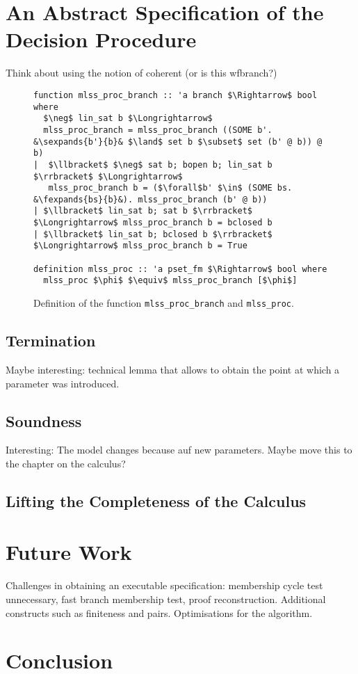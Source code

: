 \documentclass[sigplan,10pt,anonymous,review]{acmart}
\newcommand{\lefttrianglebar}{\mathrel{\tikz[baseline]{\draw (1ex, 0.75ex) -- (0, 1.25ex) -- (0, 0.25ex) -- cycle; \draw (0, 0.75ex) -- (1ex, 0.75ex);}}}
\newcommand{\lefttriangle}{\mathrel{\tikz[baseline]{\draw (1ex, 0.75ex) -- (0, 1.25ex) -- (0, 0.25ex) -- cycle;}}}
\newcommand{\sexpands}[2]{#1 $\lefttriangle$ #2}
\newcommand{\fexpands}[2]{#1 $\lefttrianglebar$ #2}
\begin{document}
\section{An Abstract Specification of the Decision Procedure}
Think about using the notion of coherent (or is this wfbranch?)
\begin{figure*}
  \centering
\begin{lstlisting}
function mlss_proc_branch :: 'a branch $\Rightarrow$ bool where
  $\neg$ lin_sat b $\Longrightarrow$
  mlss_proc_branch = mlss_proc_branch ((SOME b'. &\sexpands{b'}{b}& $\land$ set b $\subset$ set (b' @ b)) @ b)
|  $\llbracket$ $\neg$ sat b; bopen b; lin_sat b $\rrbracket$ $\Longrightarrow$
   mlss_proc_branch b = ($\forall$b' $\in$ (SOME bs. &\fexpands{bs}{b}&). mlss_proc_branch (b' @ b))
| $\llbracket$ lin_sat b; sat b $\rrbracket$ $\Longrightarrow$ mlss_proc_branch b = bclosed b
| $\llbracket$ lin_sat b; bclosed b $\rrbracket$ $\Longrightarrow$ mlss_proc_branch b = True

definition mlss_proc :: 'a pset_fm $\Rightarrow$ bool where
  mlss_proc $\phi$ $\equiv$ mlss_proc_branch [$\phi$]
\end{lstlisting}
\caption{Definition of the function \lstinline|mlss_proc_branch| and \lstinline|mlss_proc|.}
\end{figure*}

\subsection{Termination}
Maybe interesting: technical lemma that allows to obtain the point at which a parameter was introduced.
\subsection{Soundness}
Interesting: The model changes because auf new parameters.
Maybe move this to the chapter on the calculus?
\subsection{Lifting the Completeness of the Calculus}

\section{Future Work}
Challenges in obtaining an executable specification: membership cycle test unnecessary, fast branch membership test, proof reconstruction.
Additional constructs such as finiteness and pairs.
Optimisations for the algorithm.

\section{Conclusion}

\begin{acks}
\end{acks}



\end{document}
